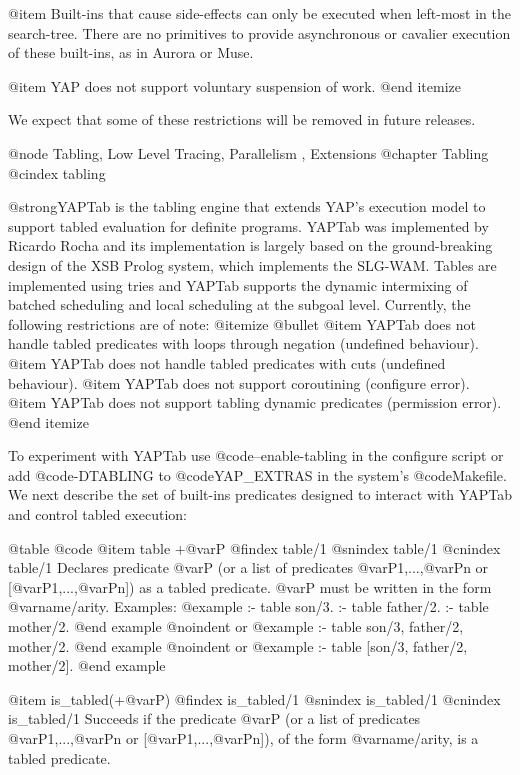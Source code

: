 {{{{{{{{@item Built-ins that cause side-effects can only be executed when
left-most in the search-tree. There are no primitives to provide
asynchronous or cavalier execution of these built-ins, as in Aurora or
Muse.

@item YAP does not support voluntary suspension of work.
@end itemize

We expect that some of these restrictions will be removed in future
releases.

@node Tabling, Low Level Tracing, Parallelism , Extensions
@chapter Tabling
@cindex tabling

@strong{YAPTab} is the tabling engine that extends YAP's execution
model to support tabled evaluation for definite programs. YAPTab was
implemented by Ricardo Rocha and its implementation is largely based
on the ground-breaking design of the XSB Prolog system, which
implements the SLG-WAM. Tables are implemented using tries and YAPTab
supports the dynamic intermixing of batched scheduling and local
scheduling at the subgoal level. Currently, the following restrictions
are of note:
@itemize @bullet
@item YAPTab does not handle tabled predicates with loops through negation (undefined behaviour).
@item YAPTab does not handle tabled predicates with cuts (undefined behaviour).
@item YAPTab does not support coroutining (configure error).
@item YAPTab does not support tabling dynamic predicates (permission error).
@end itemize

To experiment with YAPTab use @code{--enable-tabling} in the configure
script or add @code{-DTABLING} to @code{YAP_EXTRAS} in the system's
@code{Makefile}. We next describe the set of built-ins predicates
designed to interact with YAPTab and control tabled execution:

@table @code
@item table +@var{P}
@findex table/1
@snindex table/1
@cnindex table/1
Declares predicate @var{P} (or a list of predicates
@var{P1},...,@var{Pn} or [@var{P1},...,@var{Pn}]) as a tabled
predicate. @var{P} must be written in the form
@var{name/arity}. Examples:
@example
:- table son/3.
:- table father/2.
:- table mother/2.
@end example
@noindent or
@example
:- table son/3, father/2, mother/2.
@end example
@noindent or
@example
:- table [son/3, father/2, mother/2].
@end example

@item is_tabled(+@var{P})
@findex is_tabled/1
@snindex is_tabled/1
@cnindex is_tabled/1
Succeeds if the predicate @var{P} (or a list of predicates
@var{P1},...,@var{Pn} or [@var{P1},...,@var{Pn}]), of the form
@var{name/arity}, is a tabled predicate.

}}}}}}}}

